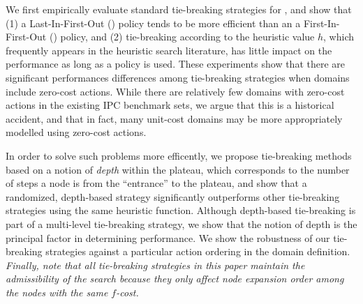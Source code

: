 We first empirically evaluate standard tie-breaking strategies for \astar, and show that 
% 
(1) a Last-In-First-Out (\lifo) policy tends to be more efficient than an a First-In-First-Out (\fifo) policy, and 
% 
(2) tie-breaking according to the heuristic value $h$, which
frequently appears in the heuristic search literature, has little 
impact on the performance as long as a \lifo policy is used.
% 
These experiments show that there are significant performances differences among tie-breaking strategies
when domains include zero-cost actions.  While there are relatively few domains with zero-cost actions in the existing IPC benchmark sets, we argue that this is a historical accident, and that in fact, many unit-cost domains may be more appropriately modelled using zero-cost actions.

In order to solve such problems more efficently,
we propose 
tie-breaking methods
based on a notion of \emph{depth} within the plateau, which corresponds to the number of steps 
a node is from the ``entrance'' to the plateau, and show that a randomized, depth-based strategy
significantly outperforms 
other tie-breaking strategies using the same heuristic function.
Although depth-based tie-breaking is part of a multi-level tie-breaking strategy,
we show that the notion of depth is the principal factor in determining performance.
We show the robustness of our tie-breaking strategies
against a particular action ordering in the domain definition.
\emph{Finally, note that all tie-breaking strategies in this paper
maintain the admissibility of the search because they only affect node expansion
order among the nodes with the same $f$-cost.}





